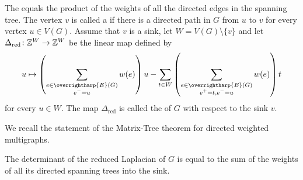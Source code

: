 The {} equals the product of the weights of all the directed edges in the spanning tree. The vertex $v$ is called a {} if there is a directed path in $G$ from $u$ to $v$ for every vertex $u \in V(G)$. Assume that $v$ is a sink, let $W = V(G) \setminus \{v\}$ and let $\Delta_{\mathrm{red}} \colon \mathbb Z^{W} \rightarrow \mathbb Z^{W}$ be the linear map defined by 
\[u \mapsto \left(\sum_{\substack{e \in \overrightharp{E}(G) \\ e^- = u}} w(e)\right)u - \sum_{t \in W}\left(\sum_{\substack{e \in \overrightharp{E}(G) \\ e^+=t, e^- = u}} w(e)\right) t \]
for every $u \in W$. The map $\Delta_{\mathrm{red}}$ is called the {} of $G$ with respect to the sink $v$.

We recall the statement of the Matrix-Tree theorem for directed weighted multigraphs.
\begin{thm}\label{matrixtree}\cite[Theorem~2.5]{ppw}
 The determinant of the reduced Laplacian of $G$ is equal to the sum of the weights of all its directed spanning trees into the sink.
\end{thm}

